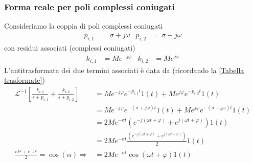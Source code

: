 \documentclass{article}
\numberwithin{equation}{subsection}
\begin{document}
\subsubsection{Forma reale per poli complessi coniugati}
Consideriamo la coppia di poli complessi coniugati
\begin{align*}
    p_{i,1} &= \sigma + j \omega & p_{i,2} &= \sigma - j \omega
\end{align*}
con residui associati (complessi coniugati)
\begin{align*}
    k_{i,1} &= Me^{-j\varphi} & k_{i,2} &= Me^{j\varphi}
\end{align*}
L'antitrasformata dei due termini associati è data da (ricordando la \ref{Tabella trasformate})
\begin{align*}
    \mathcal{L}^{-1} \left[\frac{k_{i,1}}{s+p_{i,1}} + \frac{k_{i,2}}{s+p_{i,2}}\right]      
                    &= M e^{-j \varphi} e^{-p_{i,1}t}1(t) + M e^{j \varphi} e^{-p_{i,2}t}1(t)
                    \\
                    &= M e^{-j \varphi} e^{-(\sigma + j \omega)t}1(t) + M e^{j \varphi} e^{-(\sigma - j \omega)t}1(t)
                    \\
                    &= 2M e^{-\sigma t} \left(e^{-j(\omega t + \varphi)} + e^{j(\omega t + \varphi)}\right)1(t) 
                    \\
                    &= 2M e^{-\sigma t} \frac{\left(e^{-j(\omega t + \varphi)} + e^{j(\omega t + \varphi)}\right)}{2} 1(t)
                    \\
                    \frac{e^{j \varphi} + e^{-j \varphi}}{2} = \cos(\alpha) \Longrightarrow
                    &= 2M e^{-\sigma t} \cos(\omega t + \varphi) 1(t)
\end{align*}
\end{document}
